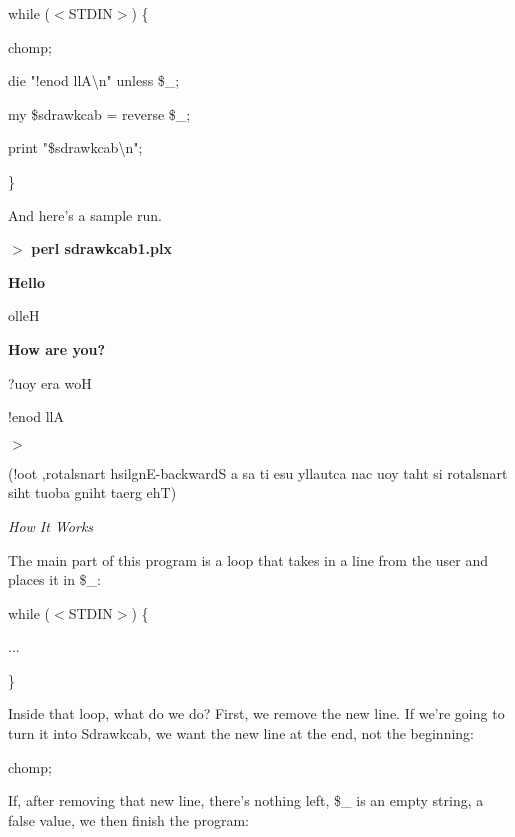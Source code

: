 \documentclass[a4paper,11pt]{book}
\begin{document}
\noindent 

\noindent while ($<$STDIN$>$) \{

\noindent chomp;

\noindent die "!enod llA\textbackslash n" unless \$\_;

\noindent my \$sdrawkcab = reverse \$\_;

\noindent print "\$sdrawkcab\textbackslash n";

\noindent \}

\noindent 

\noindent 

\noindent And here's a sample run.

\noindent 

\noindent $>$ \textbf{perl sdrawkcab1.plx}

\noindent \textbf{Hello}

\noindent olleH

\noindent \textbf{How are you?}

\noindent ?uoy era woH

\noindent 

\noindent !enod llA

\noindent $>$

\noindent 

\noindent (!oot ,rotalsnart  hsilgnE-backwardS  a  sa ti  esu  yllautca  nac  uoy taht  si  rotalsnart  siht  tuoba  gniht taerg ehT)

\noindent 

\noindent \textit{How It Works}

\noindent The main part of this program is a loop that takes in a line from the user and places it in \$\_:

\noindent 

\noindent 

\noindent while ($<$STDIN$>$) \{

\noindent ...

\noindent \}

\noindent 

\noindent Inside that loop, what do we do? First, we remove the new line. If we're going to turn it into Sdrawkcab, we want the new line at the end, not the beginning:

\noindent 

\noindent 

\noindent chomp;

\noindent 

\noindent If,  after  removing that new  line,  there's  nothing  left,  \$\_  is  an  empty  string,  a  false  value,  we then finish the program:
\end{document}
